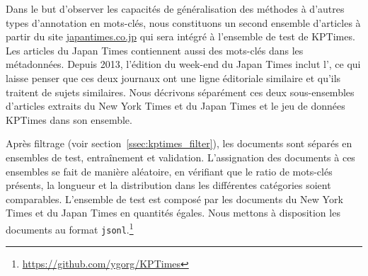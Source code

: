 Dans le but d'observer les capacités de généralisation des méthodes à d'autres types d'annotation en mots-clés, nous constituons un second ensemble d'articles à partir du site \url{japantimes.co.jp} qui sera intégré à l'ensemble de test de KPTimes. Les articles du Japan Times contiennent aussi des mots-clés dans les métadonnées.
%
Depuis 2013, l'édition du week-end du Japan Times inclut l', ce qui laisse penser que ces deux journaux ont une ligne éditoriale similaire et qu'ils traitent de sujets similaires.
%
Nous décrivons séparément ces deux sous-ensembles d'articles extraits du New York Times et du Japan Times et le jeu de données KPTimes dans son ensemble.

Après filtrage (voir section~\ref{ssec:kptimes_filter}), les documents sont séparés en ensembles de test, entraînement et validation.
L'assignation des documents à ces ensembles se fait de manière aléatoire, en vérifiant que le ratio de mots-clés présents, la longueur et la distribution dans les différentes catégories soient comparables.
L'ensemble de test est composé par les documents du New York Times et du Japan Times en quantités égales.
Nous mettons à disposition les documents au format \texttt{jsonl}.\footnote{\url{https://github.com/ygorg/KPTimes}}

%

